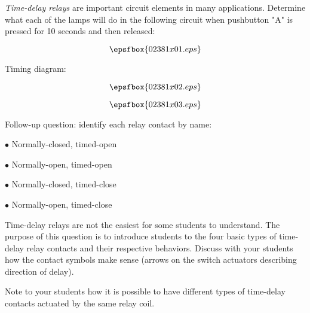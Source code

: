 

{\it Time-delay relays} are important circuit elements in many applications.  Determine what each of the lamps will do in the following circuit when pushbutton "A" is pressed for 10 seconds and then released:

$$\epsfbox{02381x01.eps}$$

Timing diagram:

$$\epsfbox{02381x02.eps}$$







$$\epsfbox{02381x03.eps}$$

\vskip 10pt

Follow-up question: identify each relay contact by name:

\medskip
\item{$\bullet$} Normally-closed, timed-open
\item{$\bullet$} Normally-open, timed-open
\item{$\bullet$} Normally-closed, timed-close
\item{$\bullet$} Normally-open, timed-close
\medskip







Time-delay relays are not the easiest for some students to understand.  The purpose of this question is to introduce students to the four basic types of time-delay relay contacts and their respective behaviors.  Discuss with your students how the contact symbols make sense (arrows on the switch actuators describing direction of delay).

Note to your students how it is possible to have different types of time-delay contacts actuated by the same relay coil.




